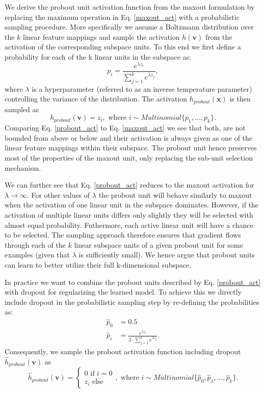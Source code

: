 \documentclass{article} \pdfoutput=1
\begin{document}
We derive the probout unit activation function from the maxout
formulation by replacing the maximum operation in
Eq. \eqref{maxout_act} with a probabilistic sampling procedure. More
specifically we assume a Boltzmann distribution over the $k$ linear
feature mappings and sample the
activation $h(\mathbf{v})$ from the activation of the corresponding
subspace units. To this end we first define a probability for each of
the k linear units in the subspace as:
\begin{equation}
  p_i = \frac{e^{\lambda z_i}}{\sum_{j=1}^k e^{\lambda z_j}},
\end{equation} 
where $\lambda$ is a hyperparameter (referred to as an inverse
temperature parameter) controlling the variance of the distribution.
The activation $h_{probout}(\mathbf{x})$ is then sampled as 
\begin{equation}
  h_{probout}(\mathbf{v}) = z_i, \text{ where } i \sim Multinomial\{p_1, \dots, p_k\}.
  \label{probout_act}
\end{equation}  
Comparing Eq. \eqref{probout_act} to Eq. \eqref{maxout_act} we see
that both, are not bounded from above or below and their activation is
always given as one of the linear feature mappings within their
subspace. The probout unit hence preserves most of the properties of
the maxout unit, only replacing the sub-unit selection mechanism.

We can further see that Eq. \eqref{probout_act} reduces to the maxout
activation for $\lambda \rightarrow \infty$. For other values of
$\lambda$ the probout unit will behave similarly to maxout when the
activation of one linear unit in the subspace dominates. However, if
the activation of multiple linear units differs only slightly they will
be selected with almost equal probability. Futhermore, each active
linear unit will have a chance to be selected. The sampling approach
therefore ensures that gradient flows through each of the $k$ linear
subspace units of a given probout unit for some examples (given that
$\lambda$ is sufficiently small). We hence argue that probout units can learn to better
utilize their full k-dimensional subspace. 


In practice we want to combine the probout units described by
Eq. \eqref{probout_act} with dropout for regularizing the learned
model.  To achieve this we directly include dropout in the
probabilistic sampling step by re-defining the probabilities as:
\begin{align}
  \hat{p}_0 &= 0.5 \\
  \hat{p}_i &= \frac{e^{\lambda z_i}}{2 \cdot \sum_{j=1}^k e^{\lambda z_j}}.
\end{align}
Consequently, we sample the probout activation function
including dropout $\hat{h}_{probout}(\mathbf{v})$ as
\begin{equation}
  \hat{h}_{probout}(\mathbf{v}) = \begin{cases} 
    0 \text{ if } i = 0 \\
    z_i \text{ else }
  \end{cases}, \text{ where } i \sim Multinomial\{\hat{p}_0 , \hat{p}_1, \dots,
  \hat{p}_k \}.
  \label{probout_actdo}
\end{equation}
\end{document}
